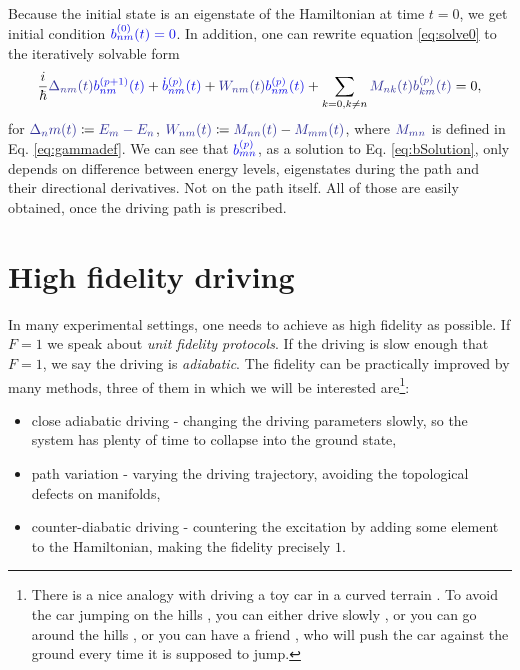 Because the initial state is an eigenstate of the Hamiltonian at time $t=0$, we get initial condition $\blue{b_{nm}^{(0)}(t)=0}$. In addition, one can rewrite equation \ref{eq:solve0} to the iteratively solvable form
\begin{equation}
    \frac{i}{\hbar}\bluee{\Delta_{nm}(t)}\blue{b_{nm}^{(p+1)}(t)}+\blue{\dot b_{nm}^{(p)}(t)}+\bluee{W_{nm}(t)} \blue{b_{nm}^{(p)}(t)}+\sum_{k=0,k\neq n}\bluee{M_{nk}(t)}\bluee{b_{km}^{(p)}(t)}=0,
    \label{eq:bSolution}
\end{equation}
for $\bluee{\Delta_nm(t)}\coloneqq \bluee{E_m-E_n}$, $\bluee{W_{nm}(t)}\coloneqq \bluee{M_{nn}(t)}-\bluee{M_{mm}(t)}$, where $\bluee{M_{mn}}$ is defined in Eq. \ref{eq:gammadef}. We can see that $\blue{b_{mn}^{(p)}}$, as a solution to Eq. \ref{eq:bSolution}, only depends on difference between energy levels, eigenstates during the path and their directional derivatives. Not on the path itself. All of those are easily obtained, once the driving path is prescribed.











\section{High fidelity driving}
\label{chap:typesOfDriving}
In many experimental settings, one needs to achieve as high fidelity as possible. If $F=1$ we speak about \emph{unit fidelity protocols}. If the driving is slow enough that $F=1$, we say the driving is \emph{adiabatic}. The fidelity can be practically improved by many methods, three of them in which we will be interested are\footnote{There is a nice analogy with driving a toy car  in a curved terrain . To avoid the car jumping on the hills , you can either drive slowly , or you can go around the hills , or you can have a friend , who will push the car against the ground every time it is supposed to jump.}:
\begin{itemize}
    \item close adiabatic driving - changing the driving parameters slowly, so the system has plenty of time to collapse into the ground state,
    \item path variation - varying the driving trajectory, avoiding the topological defects on manifolds,
    \item counter-diabatic driving - countering the excitation by adding some element to the Hamiltonian, making the fidelity precisely $1$.
\end{itemize}



